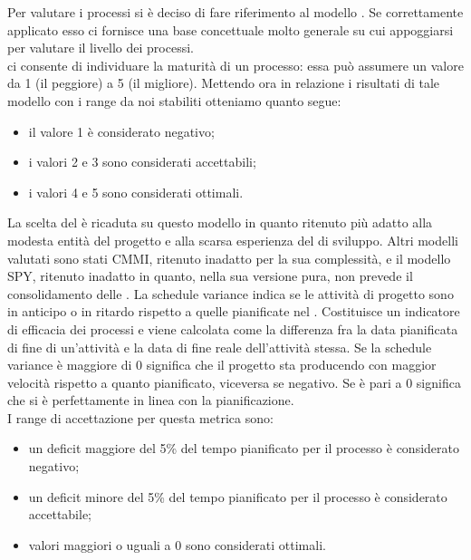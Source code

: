 			 \label{subsec:metricaCMM}
				Per valutare i processi si è deciso di fare riferimento al modello . Se correttamente applicato esso ci fornisce una base 
				concettuale molto generale su cui appoggiarsi per valutare il livello dei processi.\\
				 ci consente di individuare la maturità di un processo: essa può assumere un valore da 1 (il peggiore) a 5 (il migliore). Mettendo ora in relazione i risultati di tale modello con i range da noi stabiliti otteniamo quanto segue:
				\begin{itemize}
					\item il valore 1 è considerato negativo;
					\item i valori 2 e 3 sono considerati accettabili;
					\item i valori 4 e 5 sono considerati ottimali.
				\end{itemize}
				La scelta del  è ricaduta su questo modello in quanto ritenuto più adatto alla modesta entità del progetto e alla scarsa esperienza del  di sviluppo. Altri modelli valutati sono stati CMMI, ritenuto inadatto per la sua complessità, e il modello SPY, ritenuto inadatto in quanto, nella sua versione pura, non prevede il consolidamento delle .
			 \label{subsec:scheduleVariance}
				La schedule variance indica se le attività di progetto sono in anticipo o in ritardo rispetto a quelle pianificate nel . Costituisce un indicatore di efficacia dei processi e viene calcolata come la differenza fra la data pianificata di fine di un'attività e la data di fine reale dell'attività stessa. Se la schedule variance è maggiore di 0 significa che il progetto sta producendo con maggior velocità rispetto a quanto pianificato, viceversa se negativo. Se è pari a 0 significa che si è perfettamente in linea con la pianificazione.\\
				I range di accettazione per questa metrica sono:
				\begin{itemize}
					\item un deficit maggiore del 5\% del tempo pianificato per il processo è considerato negativo;
					\item un deficit minore del 5\% del tempo pianificato per il processo è considerato accettabile;
					\item valori maggiori o uguali a 0 sono considerati ottimali.
				\end{itemize}
